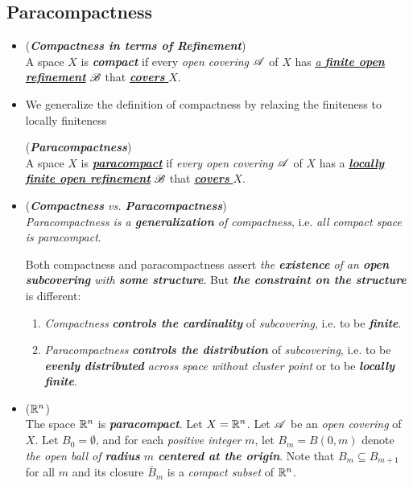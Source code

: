\documentclass[11pt]{article}
\begin{document}
\subsection{Paracompactness}
\begin{itemize}
\item \begin{definition} (\emph{\textbf{Compactness in terms of Refinement}})\\
A space $X$ is \emph{\textbf{compact}} if every \emph{open covering} ${\mathscr A}$ of $X$ has \underline{\emph{a \textbf{finite open refinement}}} ${\mathscr B}$ that \underline{\emph{\textbf{covers}} $X$}.
\end{definition}

\item We generalize the definition of compactness by relaxing the finiteness to locally finiteness
\begin{definition}  (\emph{\textbf{Paracompactness}})\\
A space $X$ is  \underline{\emph{\textbf{paracompact}}} if \emph{every open covering} ${\mathscr A}$ of $X$ has a \underline{\emph{\textbf{locally finite open refinement}}} ${\mathscr B}$ that \underline{\emph{\textbf{covers}} $X$}.
\end{definition}

\item \begin{remark} (\emph{\textbf{Compactness} vs. \textbf{Paracompactness}})\\
\emph{Paracompactness is a \textbf{generalization} of compactness}, i.e. \emph{all compact space is paracompact}. 

Both compactness and paracompactness assert \emph{the \textbf{existence} of an \textbf{open subcovering} with \textbf{some structure}}. But \emph{\textbf{the constraint on the structure}} is different:
\begin{enumerate}
\item \emph{Compactness} \emph{\textbf{controls the cardinality}} of \emph{subcovering}, i.e. to be \emph{\textbf{finite}}.
\item \emph{Paracompactness} \emph{\textbf{controls the distribution}} of \emph{subcovering}, i.e. to be \emph{\textbf{evenly distributed} across space without cluster point} or to be \emph{\textbf{locally finite}}.
\end{enumerate}
\end{remark}

\item \begin{example} (\textbf{\emph{${\mathbb R}^n$}}) \\
The space ${\mathbb R}^n$ is \emph{\textbf{paracompact}}. Let $X = {\mathbb R}^n$. Let ${\mathscr A}$ be an \emph{open covering} of $X$. Let $B_0 = \emptyset$, and for each \emph{positive integer} $m$, let $B_m= B(0, m)$ denote \emph{the open ball of \textbf{radius} $m$ \textbf{centered at the origin}}. Note that $B_m \subseteq B_{m+1}$ for all $m$ and its closure $\bar{B}_m$ is a \emph{compact subset} of ${\mathbb R}^n$.
 

\end{example}
\end{itemize}
\end{document}
